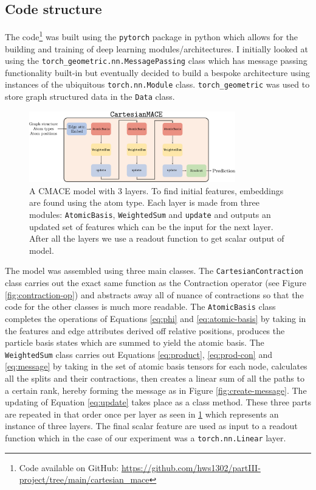 \subsection{Code structure}

The code\footnote{Code available on GitHub: \url{https://github.com/hws1302/partIII-project/tree/main/cartesian_mace}} was built using the \texttt{pytorch} package in python which allows for the  building and training of deep learning modules/architectures. I initially looked at using the \texttt{torch\_geometric.nn.MessagePassing} class which has message passing functionality built-in but eventually decided to build a bespoke architecture using instances of the ubiquitous \texttt{torch.nn.Module} class. \texttt{torch\_geometric} was used to store graph structured data in the \texttt{Data} class.  

\begin{figure}[H]
    \centering
    \includegraphics[width=0.8\textwidth]{figures/architecture.png}
    \caption{A CMACE model with 3 layers. To find initial features, embeddings are found using the atom type. Each layer is made from three modules: \texttt{AtomicBasis}, \texttt{WeightedSum} and \texttt{update} and outputs an updated set of features which can be the input for the next layer. After all the layers we use a readout function to get scalar output of model.}
    \label{fig:architecture}
\end{figure}


The model was assembled using three main classes. The \texttt{CartesianContraction} class carries out the exact same function as the Contraction operator (see Figure \ref{fig:contraction-op}) and abstracts away all of nuance of contractions so that the code for the other classes is much more readable. The \texttt{AtomicBasis} class completes the operations of Equations \ref{eq:phi} and \ref{eq:atomic-basis} by taking in the features and edge attributes derived off relative positions, produces the particle basis states which are summed to yield the atomic basis. The \texttt{WeightedSum} class carries out Equations \ref{eq:product}, \ref{eq:prod-con} and \ref{eq:message} by taking in the set of atomic basis tensors for each node, calculates all the splits and their contractions, then creates a linear sum of all the paths to a certain rank, hereby forming the message as in Figure \ref{fig:create-message}. The updating of Equation \ref{eq:update} takes place as a class method. These three parts are repeated in that order once per layer as seen in \ref{fig:architecture} which represents an instance of three layers. The final scalar feature are used as input to a readout function which in the case of our experiment was a \texttt{torch.nn.Linear} layer. 

